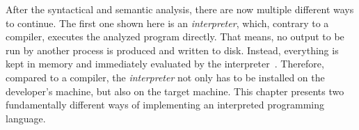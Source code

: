 After the syntactical and semantic analysis, there are now multiple different ways to continue.
The first one shown here is an \emph{interpreter}, which, contrary to a compiler, executes the analyzed program directly.
That means, no output to be run by another process is produced and written to disk.
Instead, everything is kept in memory and immediately evaluated by the interpreter~\cite[Chapter~1]{Mak2009}.
Therefore, compared to a compiler, the \emph{interpreter} not only has to be installed on the developer's machine, but also on the target machine.
This chapter presents two fundamentally different ways of implementing an interpreted programming language.
